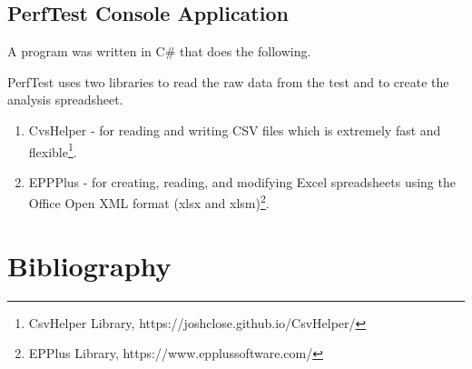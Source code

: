 \documentclass[12pt]{article}
\begin{document}
\subsection{PerfTest Console Application}
A program was written in C\# that does the following.

PerfTest uses two libraries to read the raw data from the test and to create the analysis spreadsheet. 

\begin{enumerate}
	\item CvsHelper - for reading and writing CSV files which is extremely fast and flexible\footnote{CsvHelper Library, https://joshclose.github.io/CsvHelper/}.
	\item EPPPlus - for creating, reading, and modifying Excel spreadsheets using the Office Open XML format (xlsx and xlsm)\footnote{EPPlus Library, https://www.epplussoftware.com/}.
\end{enumerate}

\newpage
\section{Bibliography}

\printbibliography[title=Sources]


%
%
%
%
\end{document}
